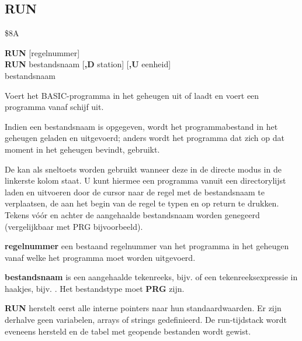 \subsection{RUN}
\begin{description}[leftmargin=2cm,style=nextline]
\item [Token:]    \$8A

\item [Formaat:]   {\bf RUN} [regelnummer] \\                {\bf RUN} bestandsnaam [{\bf,D} station] [{\bf,U} eenheid] \\                  \megakeywhite{$\uparrow$} bestandsnaam

\item [Gebruik:]    Voert het BASIC-programma in het geheugen uit of laadt en voert een programma vanaf schijf uit.

                  Indien een bestandsnaam is opgegeven, wordt het programmabestand in het geheugen geladen en uitgevoerd; anders wordt het programma dat zich op dat moment in het geheugen bevindt, gebruikt.

                  De {\bf \screentext{$\uparrow$}} kan als sneltoets worden gebruikt wanneer deze in de directe modus in de linkerste kolom staat. U kunt hiermee een programma vanuit een directorylijst laden en uitvoeren door de cursor naar de regel met de bestandsnaam te verplaatsen, de {\bf \screentext{$\uparrow$}} aan het begin van de regel te typen en op return te drukken. Tekens vóór en achter de aangehaalde bestandsnaam worden genegeerd (vergelijkbaar met PRG bijvoorbeeld).

                  {\bf regelnummer} een bestaand regelnummer van het programma in het geheugen vanaf welke het programma moet worden uitgevoerd.

{\bf bestandsnaam} is een aangehaalde tekenreeks, bijv.  of een tekenreeksexpressie in haakjes, bijv. . Het bestandstype moet {\bf PRG} zijn.

                  \drivedefinition

                  \unitdefinition

\item [Opmerkingen:]  {\bf RUN} herstelt eerst alle interne pointers naar hun standaardwaarden. Er zijn derhalve geen variabelen, arrays of strings gedefinieerd. De run-tijdstack wordt eveneens hersteld en de tabel met geopende bestanden wordt gewist.


\end{description}
